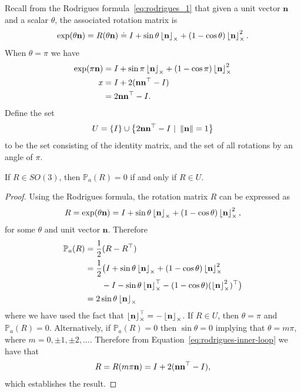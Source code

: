 Recall from the Rodrigues formula~\eqref{eq:rodrigues_1} that given a unit vector $\mathbf{n}$ and a scalar $\theta$, the associated rotation matrix is
\[
\exp(\theta\mathbf{n}) = R(\theta\mathbf{n}) \doteq I + \sin\theta \ss{\mathbf{n}} + (1-\cos\theta)\ss{\mathbf{n}}^2.
\]
When $\theta = \pi$ we have 
\begin{align*}
\exp(\pi\mathbf{n}) &= I + \sin\pi \ss{\mathbf{n}} + (1-\cos\pi)\ss{\mathbf{n}}^2 \\x
  &= I + 2(\nbf\nbf^\top - I) \\
  &= 2\nbf\nbf^\top - I.
\end{align*}
Define the set 
\[
U = \{ I\} \cup \left\{2\nbf\nbf^\top - I ~|~ \norm{\nbf}=1  \right\}
\]
to be the set consisting of the identity matrix, and the set of all rotations by an angle of $\pi$.
\begin{lemma}\label{lem:set_U}
If $R\in SO(3)$, then $\mathbb{P}_a(R)=0$ if and only if $R\in U$.
\end{lemma}
\begin{proof}
Using the Rodrigues formula, the rotation matrix $R$ can be expressed as 
\begin{equation}\label{eq:rodrigues-inner-loop}
R = \exp(\theta \mathbf{n}) = I + \sin\theta \ss{\nbf} + (1-\cos\theta)\ss{\nbf}^2,
\end{equation}
for some $\theta$ and unit vector $\mathbf{n}$.  Therefore 
\begin{align*}
\mathbb{P}_a(R) &= \frac{1}{2}(R-R^\top) \\
                &= \frac{1}{2}\big( I + \sin\theta \ss{\nbf} + (1-\cos\theta) \ss{\nbf}^2 \\
                &\qquad - I - \sin\theta \ss{\nbf}^\top - (1-\cos\theta) (\ss{\nbf}^2)^\top\big) \\
                &= 2 \sin\theta \ss{\nbf} 
\end{align*}
where we have used the fact that $\ss{\nbf}^\top=-\ss{\nbf}$.  If $R\in U$, then $\theta=\pi$ and $\mathbb{P}_a(R)=0$.  Alternatively, if $\mathbb{P}_a(R)=0$ then $\sin\theta=0$ implying that $\theta = m\pi$, where $m=0, \pm 1, \pm 2, \dots$.  Therefore from Equation~\eqref{eq:rodrigues-inner-loop} we have that
\[
R = R(m\pi\mathbf{n}) = I  + 2(\nbf\nbf^\top - I),
\]
which establishes the result.
\end{proof}

